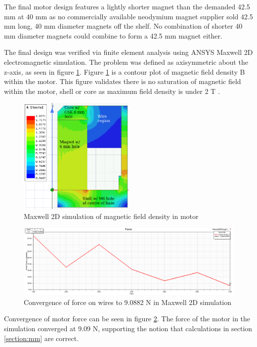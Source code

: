 \documentclass[a4paper,12pt]{article}
\begin{document}
The final motor design features a lightly shorter magnet than the demanded 42.5 mm at 40 mm as no commercially available neodymium magnet supplier sold 42.5 mm long, 40 mm diameter magnets off the shelf. No combination of shorter 40 mm diameter magnets could combine to form a 42.5 mm magnet either.

The final design was verified via finite element analysis using ANSYS Maxwell 2D electromagnetic simulation. The problem was defined as axisymmetric about the z-axis, as seen in figure \ref{fg:maxwellB}. Figure \ref{fg:maxwellB} is a contour plot of magnetic field density B within the motor. This figure validates there is no saturation of magnetic field within the motor, shell or core as maximum field density is under 2 T \cite{mclymanMagneticMaterialsTheir2004}.

\begin{figure}[h!]
    \centering
    \includegraphics[width=0.5\textwidth]{maxwell.png}
    \caption{Maxwell 2D simulation of magnetic field density in motor}
    \label{fg:maxwellB}
\end{figure}

\begin{figure}[h!]
    \centering
    \includegraphics[width=\textwidth]{force.png}
    \caption{Convergence of force on wires to 9.0882 N in Maxwell 2D simulation}
    \label{fg:maxwellforce}
\end{figure}

Convergence of motor force can be seen in figure \ref{fg:maxwellforce}. The force of the motor in the simulation converged at 9.09 N, supporting the notion that calculations in section \ref{section:mm} are correct.
\end{document}
